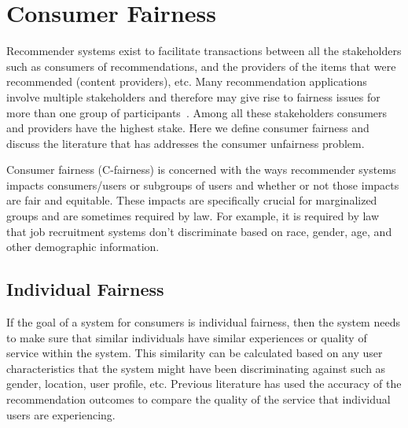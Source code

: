 
\section{Consumer Fairness}
\label{fairness_cf}

Recommender systems exist to facilitate transactions between all the stakeholders such as consumers of recommendations, and the providers of the items that were recommended (content providers), etc. Many recommendation applications involve multiple stakeholders and therefore may give rise to fairness issues for more than one group of participants~\cite{burke_multisided_2017}. Among all these stakeholders consumers and providers have the highest stake. Here we  define consumer fairness and discuss the literature that has addresses the consumer unfairness problem.

Consumer fairness (C-fairness) is concerned with the ways recommender systems impacts consumers/users or subgroups of users and whether or not those impacts are fair and equitable. These impacts are specifically crucial for marginalized groups and are sometimes required by law. For example, it is required by law that job recruitment systems don't discriminate based on race, gender, age, and other demographic information.

    \subsection{Individual Fairness}
    If the goal of a system for consumers is individual fairness, then the system needs to make sure that similar individuals have similar experiences or quality of service within the system. This similarity can be calculated based on any user characteristics that the system might have been discriminating against such as gender, location, user profile, etc. Previous literature has used the accuracy of the recommendation outcomes to compare the quality of the service that individual users are experiencing. 
    
